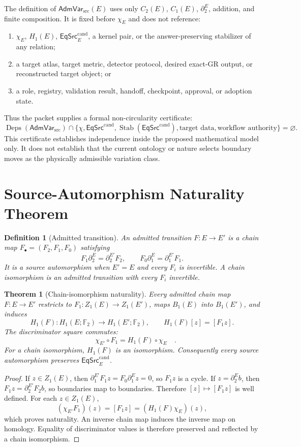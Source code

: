 \documentclass[11pt]{article}
\newtheorem{definition}{Definition}
\newtheorem{theorem}{Theorem}
\newcommand{\Ftwo}{\mathbb F_2}
\newcommand{\AdmVar}{\mathsf{AdmVar}_{\mathrm{src}}}
\newcommand{\EqCand}{\mathsf{EqSrc}^{\mathrm{cand}}}
\begin{document}
The definition of \(\AdmVar(E)\) uses only
\(C_2(E)\), \(C_1(E)\), \(\partial_2^E\), addition, and finite composition.
It is fixed before \(\chi_E\) and does not reference:
\begin{enumerate}[leftmargin=*]
  \item \(\chi_E\), \(H_1(E)\), \(\EqCand_E\), a kernel pair, or the
  answer-preserving stabilizer of any relation;
  \item a target atlas, target metric, detector protocol, desired exact-GR
  output, or reconstructed target object; or
  \item a role, registry, validation result, handoff, checkpoint, approval, or
  adoption state.
\end{enumerate}
Thus the packet supplies a formal non-circularity certificate:
\[
 \operatorname{Deps}(\AdmVar)
 \cap\{\chi,\EqCand,\operatorname{Stab}(\EqCand),
 \text{target data},\text{workflow authority}\}=\varnothing.
\]
This certificate establishes independence inside the proposed mathematical
model only. It does not establish that the current ontology or nature selects
boundary moves as the physically admissible variation class.

\section{Source-Automorphism Naturality Theorem}

\begin{definition}[Admitted transition]
An admitted transition \(F:E\to E'\) is a chain map
\(F_\bullet=(F_2,F_1,F_0)\) satisfying
\[
 F_1\partial_2^E=\partial_2^{E'}F_2,\qquad
 F_0\partial_1^E=\partial_1^{E'}F_1.
\]
It is a source automorphism when \(E'=E\) and every \(F_i\) is invertible.
A chain isomorphism is an admitted transition with every \(F_i\) invertible.
\end{definition}

\begin{theorem}[Chain-isomorphism naturality]
Every admitted chain map \(F:E\to E'\) restricts to
\(F_1:Z_1(E)\to Z_1(E')\), maps \(B_1(E)\) into \(B_1(E')\), and induces
\[
 H_1(F):H_1(E;\Ftwo)\longrightarrow H_1(E';\Ftwo),
 \qquad H_1(F)[z]=[F_1z].
\]
The discriminator square commutes:
\[
 \boxed{\quad
 \chi_{E'}\circ F_1=H_1(F)\circ\chi_E
 \quad}.
\]
For a chain isomorphism, \(H_1(F)\) is an isomorphism. Consequently every
source automorphism preserves \(\EqCand_E\).
\end{theorem}

\begin{proof}
If \(z\in Z_1(E)\), then
\(\partial_1^{E'}F_1z=F_0\partial_1^Ez=0\), so \(F_1z\) is a cycle. If
\(z=\partial_2^Eb\), then
\(F_1z=\partial_2^{E'}F_2b\), so boundaries map to boundaries. Therefore
\([z]\mapsto[F_1z]\) is well defined. For each \(z\in Z_1(E)\),
\[
 (\chi_{E'}F_1)(z)=[F_1z]
 =(H_1(F)\chi_E)(z),
\]
which proves naturality. An inverse chain map induces the inverse map on
homology. Equality of discriminator values is therefore preserved and
reflected by a chain isomorphism.
\end{proof}
\end{document}
